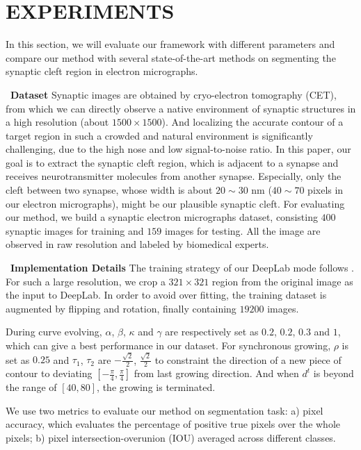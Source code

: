 \section{EXPERIMENTS}
\label{sec:experiments}
In this section, we will evaluate our framework with different parameters and compare our method with several state-of-the-art methods on segmenting the synaptic cleft region in electron micrographs.

~\noindent\textbf{Dataset}
Synaptic images are obtained by cryo-electron tomography (CET), from which we can directly observe a native environment of synaptic structures in a high resolution (about $1500\times 1500$).
%
And localizing the accurate contour of a target region in such a crowded and natural environment is significantly challenging, due to the high nose and low signal-to-noise ratio.
In this paper, our goal is to extract the synaptic cleft region, which is adjacent to a synapse and receives neurotransmitter molecules from another synapse.
Especially, only the cleft between two synapse, whose width is about $20\sim30$ nm ($40\sim70$ pixels in our electron micrographs), might be our plausible synaptic cleft.
%
For evaluating our method, we build a synaptic electron micrographs dataset, consisting $400$ synaptic images for training and $159$ images for testing.
All the image are observed in raw resolution and labeled by biomedical experts.

~\noindent\textbf{Implementation Details}
The training strategy of our DeepLab mode follows \cite{Chen2016a}.
For such a large resolution, we crop a $321\times 321$ region \cite{Chen2016} from the original image as the input to DeepLab.
In order to avoid over fitting, the training dataset is augmented by flipping and rotation, finally containing $19200$ images.

During curve evolving, $\alpha$, $\beta$, $\kappa$ and $\gamma$ are respectively set as $0.2$, $0.2$, $0.3$ and $1$, which can give a best performance in our dataset.
For synchronous growing, $\rho$ is set as $0.25$ and $\tau_1$, $\tau_2$ are $-\frac{\sqrt{2}}{2}$, $\frac{\sqrt{2}}{2}$ to constraint the direction of a new piece of contour to deviating $[-\frac{\pi}{4},\frac{\pi}{4}]$ from last growing direction.
And when $d^{t}$ is beyond the range of $[40,80]$, the growing is terminated.

We use two metrics \cite{Cheng2017} to evaluate our method on segmentation task:
a) pixel accuracy, which evaluates the percentage of positive true pixels over the whole pixels;
b) pixel intersection-overunion (IOU) averaged across different classes.


